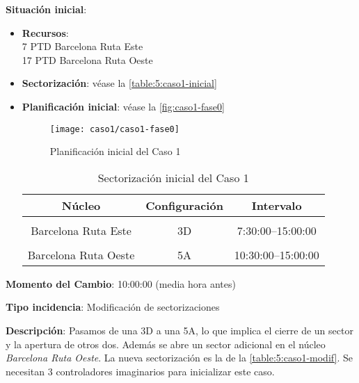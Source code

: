 \textbf{Situación inicial}:
\begin{itemize}[label={}]
		
	\item \textbf{Recursos}: \\
	7 PTD Barcelona Ruta Este \\
	17 PTD Barcelona Ruta Oeste
	
	\item \textbf{Sectorización}: véase la \autoref{table:5:caso1-inicial}
	
	\item \textbf{Planificación inicial}: véase la \autoref{fig:caso1-fase0}
	
	\begin{figure}[h]
		\centering
		\texttt{[image: caso1/caso1-fase0]}
		\caption{Planificación inicial del Caso 1}
		\label{fig:caso1-fase0}
	\end{figure}
	
	\begin{table}[h]
		\centering
		\caption{Sectorización inicial del Caso 1}
		\begin{tabular}{ccc}
			\hline
			\textbf{Núcleo}      & \textbf{Configuración} & \textbf{Intervalo}   \\ \hline
			\multicolumn{1}{l}{} & \multicolumn{1}{l}{}   & \multicolumn{1}{l}{} \\
			Barcelona Ruta Este  & 3D                     & 7:30:00--15:00:00    \\
			\multicolumn{1}{l}{} & \multicolumn{1}{l}{}   & \multicolumn{1}{l}{} \\
			Barcelona Ruta Oeste & 5A                     & 10:30:00--15:00:00   \\ \hline
		\end{tabular}
		\label{table:5:caso1-inicial}
	\end{table}
	
\end{itemize}

\textbf{Momento del Cambio}: 10:00:00 (media hora antes)

\textbf{Tipo incidencia}: Modificación de sectorizaciones

\textbf{Descripción}: Pasamos de una 3D a una 5A, lo que implica el cierre de un sector y la apertura de otros dos. Además se abre un sector adicional en el núcleo \textit{Barcelona Ruta Oeste}. La nueva sectorización es la de la \autoref{table:5:caso1-modif}. Se necesitan 3 controladores imaginarios para inicializar este caso.

